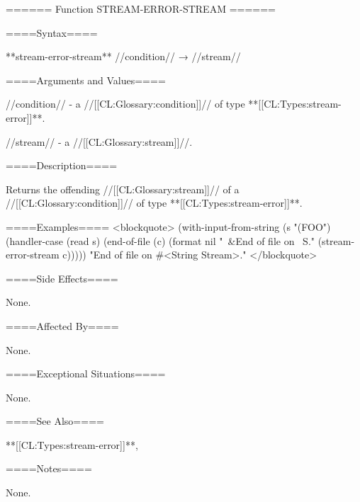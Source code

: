 ====== Function STREAM-ERROR-STREAM ======

====Syntax====

**stream-error-stream** //condition// → //stream//

====Arguments and Values====

//condition// - a //[[CL:Glossary:condition]]// of type **[[CL:Types:stream-error]]**.

//stream// - a //[[CL:Glossary:stream]]//.

====Description====

Returns the offending //[[CL:Glossary:stream]]// of a //[[CL:Glossary:condition]]// of type **[[CL:Types:stream-error]]**.

====Examples==== <blockquote> (with-input-from-string (s "(FOO") (handler-case (read s) (end-of-file (c) (format nil "~&End of file on ~S." (stream-error-stream c))))) "End of file on #<String Stream>." </blockquote>

====Side Effects====

None.

====Affected By====

None.

====Exceptional Situations====

None.

====See Also====

**[[CL:Types:stream-error]]**,{\secref\Conditions}

====Notes====

None.

